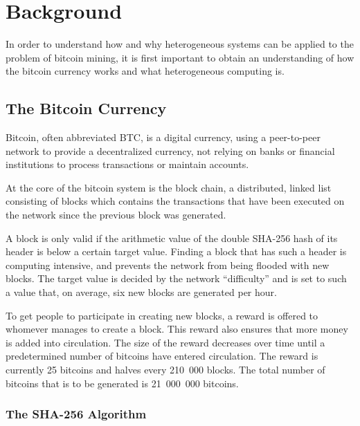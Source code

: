 \chapter{Background}
\label{cha:background}

In order to understand how and why heterogeneous systems can be applied to the problem of
bitcoin mining, it is first important to obtain an understanding of how the bitcoin currency
works and what heterogeneous computing is.

\section{The Bitcoin Currency}
\label{sec:bitcoins}
Bitcoin, often abbreviated BTC, is a digital currency, using a peer-to-peer network to provide
a decentralized currency, not relying on banks or financial institutions to process transactions
or maintain accounts.

At the core of the bitcoin system is the block chain, a distributed, linked list consisting of blocks
which contains the transactions that have been executed on the network since the previous block was
generated.

A block is only valid if the arithmetic value of the double SHA-256 hash of its header is below
a certain target value. Finding a block that has such a header is computing intensive, and prevents
the network from being flooded with new blocks. The target value is decided by the network ``difficulty''
and is set to such a value that, on average, six new blocks are generated per hour.

To get people to participate in creating new blocks, a reward is offered to whomever manages to
create a block. This reward also ensures that more money is added into circulation. The size of
the reward decreases over time until a predetermined number of bitcoins have entered circulation.
The reward is currently 25 bitcoins and halves every 210~000 blocks. The total number of bitcoins
that is to be generated is 21~000~000 bitcoins. \cite{bitcoin}

\subsection{The SHA-256 Algorithm}
